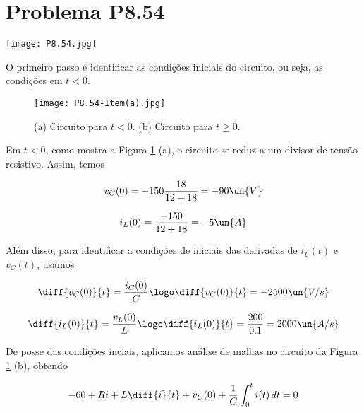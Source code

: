 
\section*{Problema P8.54}

\renewcommand*\thesection{8.54}

\begin{center}
    \texttt{[image: P8.54.jpg]}
\end{center}

O primeiro passo é identificar as condições iniciais do circuito, ou seja, as condições em $t<0$. 

\begin{figure}[hb]
    \centering
    \caption{(a) Circuito para $t<0$. (b) Circuito para $t \geq 0$.}
      \centering
      \texttt{[image: P8.54-Item(a).jpg]} \\
    \label{fig:8.54.1}
\end{figure}

Em $t<0$, como mostra a Figura \ref*{fig:8.54.1} (a), o circuito se reduz a um divisor de tensão resistivo. Assim, temos  

\begin{equation}\label{eq:8.54.1}
    v_C(0) = -150\frac{18}{12 + 18} = - 90 \un{V}
\end{equation}

\begin{equation}\label{eq:8.54.2}
    i_L(0) = \frac{-150}{12 + 18} = - 5 \un{A}
\end{equation}

Além disso, para identificar a condições de iniciais das derivadas de $i_L(t)$ e $v_C(t)$, usamos  

\begin{equation}\label{eq:8.54.3}
    \diff{v_C(0)}{t} = \frac{i_C(0)}{C} \logo \diff{v_C(0)}{t} = -2500 \un{V/s}
\end{equation}

\begin{equation}\label{eq:8.54.4}
    \diff{i_L(0)}{t} = \frac{v_L(0)}{L} \logo \diff{i_L(0)}{t} = \frac{200}{0.1} = 2000 \un{A/s}
\end{equation}

De posse das condições inciais, aplicamos análise de malhas no circuito da Figura \ref*{fig:8.54.1} (b), obtendo

\[ -60 + Ri + L\diff{i}{t} + v_C(0) + \frac{1}{C} \int_{0}^{t}i(t) \, dt = 0 \]

